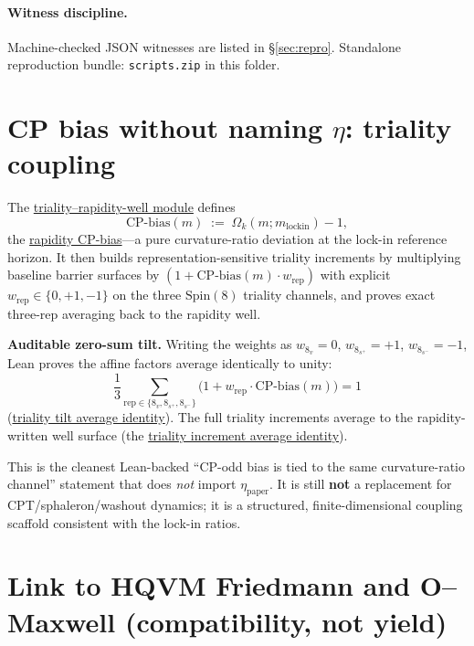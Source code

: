 \documentclass[11pt]{amsart}
\newcommand{\LeanEng}[2]{\hyperref[#1]{#2}}
\begin{document}
\paragraph{Witness discipline.}
Machine-checked JSON witnesses are listed in \S\ref{sec:repro}. Standalone
reproduction bundle: \texttt{scripts.zip} in this folder.

\section{CP bias without naming \(\eta\): triality coupling}

The \LeanEng{lean:triality-well}{triality--rapidity-well module} defines
\[
\mathrm{CP\text{-}bias}(m) \;:=\; \Omega_k(m;m_{\mathrm{lockin}})-1,
\]
the \LeanEng{lean:rapidity-cp-bias}{rapidity CP-bias}---a pure
curvature-ratio deviation at the lock-in reference horizon. It then
builds representation-sensitive triality increments by multiplying baseline
barrier surfaces by $(1+\mathrm{CP\text{-}bias}(m)\cdot w_{\mathrm{rep}})$
with explicit $w_{\mathrm{rep}}\in\{0,+1,-1\}$ on the three
$\mathrm{Spin}(8)$ triality channels, and proves exact three-rep averaging
back to the rapidity well.

\medskip
\noindent\textbf{Auditable zero-sum tilt.}
Writing the weights as $w_{8_v}=0$, $w_{8_{s^+}}=+1$, $w_{8_{s^-}}=-1$,
Lean proves the affine factors average identically to unity:
\begin{equation}
\label{eq:triality-tilt-average}
\frac{1}{3}\sum_{\mathrm{rep}\in\{8_v,8_{s^+},8_{s^-}\}}
\bigl(1+w_{\mathrm{rep}}\cdot \mathrm{CP\text{-}bias}(m)\bigr)=1
\end{equation}
(\LeanEng{lean:triality-tilt-avg}{triality tilt average identity}).
The full triality increments average to the rapidity-written well surface
(the \LeanEng{lean:triality-inc-avg}{triality increment average identity}).

This is the cleanest Lean-backed ``CP-odd bias is tied to the same
curvature-ratio channel'' statement that does \emph{not} import
$\eta_{\mathrm{paper}}$. It is still \textbf{not} a replacement for
CPT/sphaleron/washout dynamics; it is a structured, finite-dimensional
coupling scaffold consistent with the lock-in ratios.

\section{Link to HQVM Friedmann and O--Maxwell (compatibility, not yield)}
\end{document}
